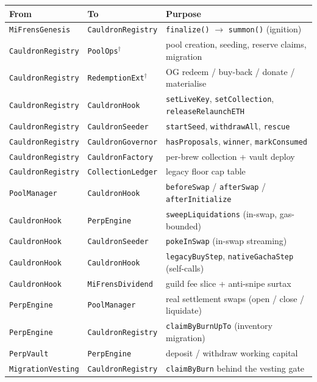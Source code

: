 \documentclass[10pt,a4paper]{article}
\newcommand{\code}[1]{\texttt{\small #1}}
\begin{document}
\begin{center}\small
\begin{tabular}{@{}lll@{}}
\toprule
\textbf{From} & \textbf{To} & \textbf{Purpose} \\
\midrule
\code{MiFrensGenesis} & \code{CauldronRegistry} & \code{finalize()} $\to$ \code{summon()} (ignition) \\
\code{CauldronRegistry} & \code{PoolOps}$^\dagger$ & pool creation, seeding, reserve claims, migration \\
\code{CauldronRegistry} & \code{RedemptionExt}$^\dagger$ & OG redeem / buy-back / donate / materialise \\
\code{CauldronRegistry} & \code{CauldronHook} & \code{setLiveKey}, \code{setCollection}, \code{releaseRelaunchETH} \\
\code{CauldronRegistry} & \code{CauldronSeeder} & \code{startSeed}, \code{withdrawAll}, \code{rescue} \\
\code{CauldronRegistry} & \code{CauldronGovernor} & \code{hasProposals}, \code{winner}, \code{markConsumed} \\
\code{CauldronRegistry} & \code{CauldronFactory} & per-brew collection + vault deploy \\
\code{CauldronRegistry} & \code{CollectionLedger} & legacy floor cap table \\
\code{PoolManager} & \code{CauldronHook} & \code{beforeSwap} / \code{afterSwap} / \code{afterInitialize} \\
\code{CauldronHook} & \code{PerpEngine} & \code{sweepLiquidations} (in-swap, gas-bounded) \\
\code{CauldronHook} & \code{CauldronSeeder} & \code{pokeInSwap} (in-swap streaming) \\
\code{CauldronHook} & \code{CauldronHook} & \code{legacyBuyStep}, \code{nativeGachaStep} (self-calls) \\
\code{CauldronHook} & \code{MiFrensDividend} & guild fee slice + anti-snipe surtax \\
\code{PerpEngine} & \code{PoolManager} & real settlement swaps (open / close / liquidate) \\
\code{PerpEngine} & \code{CauldronRegistry} & \code{claimByBurnUpTo} (inventory migration) \\
\code{PerpVault} & \code{PerpEngine} & deposit / withdraw working capital \\
\code{MigrationVesting} & \code{CauldronRegistry} & \code{claimByBurn} behind the vesting gate \\
\bottomrule
\end{tabular}
\end{center}
\end{document}

